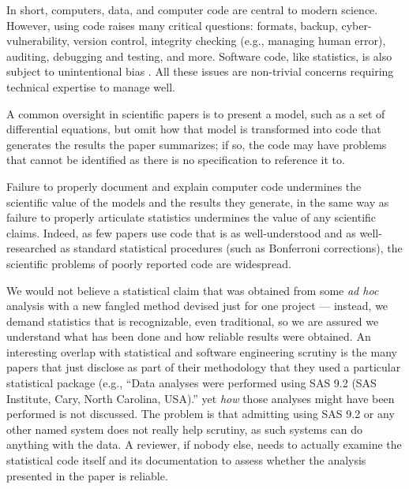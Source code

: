 In short, computers, data, and computer code are central to modern science. However, using code raises many critical questions: formats, backup, cyber-vulnerability, version control, integrity checking (e.g., managing human error), auditing, debugging and testing, and more. Software code, like statistics, is also subject to unintentional bias \cite{se-bias}.  All these issues are non-trivial concerns requiring technical expertise to manage well. 

A common oversight in scientific papers is to present a model, such as a set of differential equations, but omit how that model is transformed into code that generates the results the paper summarizes; if so, the code may have problems that cannot be identified as there is no specification to reference it to.

Failure to properly document and explain computer code undermines the scientific value of the models and the results they generate, in the same way as failure to properly articulate statistics undermines the value of any scientific claims. Indeed, as few papers use code that is as well-understood and as well-researched as standard statistical procedures (such as Bonferroni corrections), the scientific problems of poorly reported code are widespread. 


We would not believe a statistical claim that was obtained from some \emph{ad hoc\/} analysis with a new fangled method devised just for one project --- instead, we demand statistics that is recognizable, even traditional, so we are assured we understand what has been done and how reliable results were obtained. An interesting overlap with statistical and software engineering scrutiny is the many papers that just disclose as part of their methodology that they used a particular statistical package (e.g., ``Data analyses were performed using SAS 9.2 (SAS Institute, Cary, North Carolina, USA)\@.'' yet \emph{how\/} those analyses might have been performed is not discussed. The problem is that admitting using SAS 9.2 or any other named system does not really help scrutiny, as such systems can do anything with the data. A reviewer, if nobody else, needs to actually examine the statistical code itself and its documentation to assess whether the analysis presented in the paper is reliable. 

